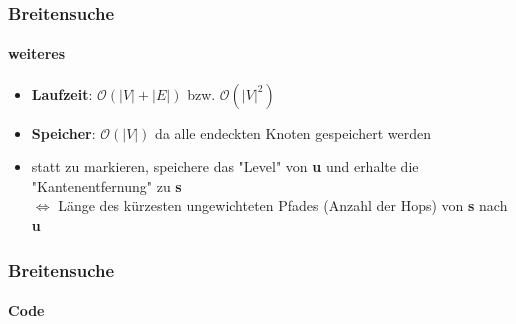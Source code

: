 \begin{frame}
    \frametitle{Breitensuche}
    \framesubtitle{weiteres}
    \begin{itemize}
        \item \textbf{Laufzeit}: \( \mathcal{O}(|V| + |E|)\) bzw. \( \mathcal{O}(|V|^2)\)
        \item \textbf{Speicher}: \( \mathcal{O}(|V|)\) da alle endeckten Knoten gespeichert werden
        \item statt zu markieren, speichere das "Level" von \textbf{u} und erhalte die "Kantenentfernung" zu \textbf{s} \\\(\iff\) Länge des kürzesten ungewichteten Pfades (Anzahl der Hops) von \textbf{s} nach \textbf{u}
    \end{itemize}
\end{frame}
\begin{frame}
    \frametitle{Breitensuche}
    \framesubtitle{Code}
    
\end{frame}
